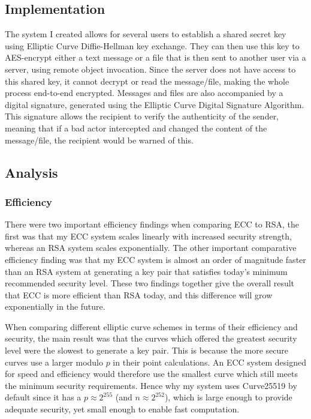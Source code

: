 \documentclass[12pt,a4paper]{article}
\begin{document}
\subsection{Implementation} \noindent
The system I created allows for several users to establish a shared secret key using Elliptic Curve Diffie-Hellman key exchange. 
They can then use this key to AES-encrypt either a text message or a file that is then sent to another user via a server, using remote object invocation. 
Since the server does not have access to this shared key, it cannot decrypt or read the message/file, making the whole process end-to-end encrypted. 
Messages and files are also accompanied by a digital signature, generated using the Elliptic Curve Digital Signature Algorithm. 
This signature allows the recipient to verify the authenticity of the sender, meaning that if a bad actor intercepted and changed the content of the message/file, the recipient would be warned of this. 

\subsection{Analysis}

\subsubsection{Efficiency} \noindent
There were two important efficiency findings when comparing ECC to RSA, 
the first was that my ECC system scales linearly with increased security strength, 
whereas an RSA system scales exponentially. 
The other important comparative efficiency finding was that my ECC system is almost an order of magnitude faster than an RSA system at generating a key pair that satisfies today's minimum recommended security level. 
These two findings together give the overall result that ECC is more efficient than RSA today, 
and this difference will grow exponentially in the future. 

When comparing different elliptic curve schemes in terms of their efficiency and security, 
the main result was that the curves which offered the greatest security level were the slowest to generate a key pair. 
This is because the more secure curves use a larger modulo $p$ in their point calculations. 
An ECC system designed for speed and efficiency would therefore use the smallest curve which still meets the minimum security requirements. 
Hence why my system uses Curve25519 by default since it has a $p \approx 2^{255}$ (and $n \approx 2^{252}$), 
which is large enough to provide adequate security, yet small enough to enable fast computation. 
\end{document}
